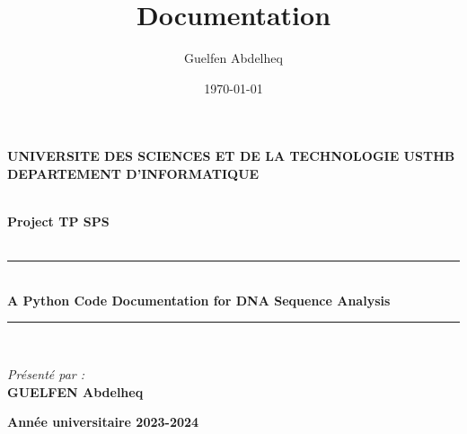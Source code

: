 \documentclass[11pt]{article}
\author{Guelfen Abdelheq}
\date{\today}
\title{Documentation}
\begin{document}
\begin{titlepage}

\begin{center}
\begin{minipage}{10cm}
	\begin{center}
	\textbf{UNIVERSITE DES SCIENCES ET DE LA TECHNOLOGIE USTHB}\\[0.1cm]
    \textbf{DEPARTEMENT D'INFORMATIQUE}
	\end{center}
\end{minipage}\hfill


\textsc{\Large }\\[2.5cm]
{\large \bfseries Project TP SPS}\\[1cm]

\textsc{\Large }\\[1cm]
\rule{\linewidth}{0.3mm} \\[0.4cm]
{ \huge \bfseries\color{darkblue} A Python Code Documentation for DNA Sequence Analysis\\[0.4cm] }
\rule{\linewidth}{0.3mm} \\[3cm]


\noindent
\begin{minipage}{0.4\textwidth}
  \begin{flushleft} \large
    \emph{Présenté par :}\\
    \textbf{GUELFEN Abdelheq}\\
  \end{flushleft}
\end{minipage}

\vfill
{\textbf{\large {Année universitaire} 2023-2024}}
\end{center}
\end{titlepage}

\tableofcontents
\newpage
\end{document}
